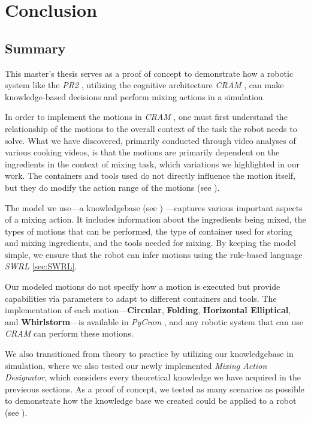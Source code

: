 \chapter{Conclusion}
\label{chap:conclusion}

\section{Summary}
This master's thesis serves as a proof of concept to demonstrate how a robotic system like the \textit{PR2} \cite{pr2}, utilizing the cognitive architecture \textit{CRAM} \cite{beetz10cram}, can make knowledge-based decisions and perform mixing actions in a simulation.

In order to implement the motions in \textit{CRAM} \cite{beetz10cram}, one must first understand the relationship of the motions to the overall context of the task the robot needs to solve. What we have discovered, primarily conducted through video analyses of various cooking videos, is that the motions are primarily dependent on the ingredients in the context of mixing task, which variations we highlighted in our work. The containers and tools used do not directly influence the motion itself, but they do modify the action range of the motions
(see ).

The model we use—a knowledgebase (see ) —captures various important aspects of a mixing action. It includes information about the ingredients being mixed, the types of motions that can be performed, the type of container used for storing and mixing ingredients, and the tools needed for mixing. By keeping the model simple, we ensure that the robot can infer motions using the rule-based language \textit{SWRL} \ref{sec:SWRL}.

Our modeled motions do not specify how a motion is executed but provide capabilities via parameters to adapt to different containers and tools. The implementation of each motion—\textbf{Circular}, \textbf{Folding}, \textbf{Horizontal Elliptical}, and \textbf{Whirlstorm}—is available in \textit{PyCram} \cite{pycram}, and any robotic system that can use \textit{CRAM} \cite{beetz10cram} can perform these motions.

We also transitioned from theory to practice by utilizing our knowledgebase in simulation, where we also tested our newly implemented \textit{Mixing Action Designator}, which considers every theoretical knowledge we have acquired in the previeous sections. As a proof of concept, we tested as many scenarios as possible to demonstrate how the knowledge base we created could be applied to a robot (see ). 

